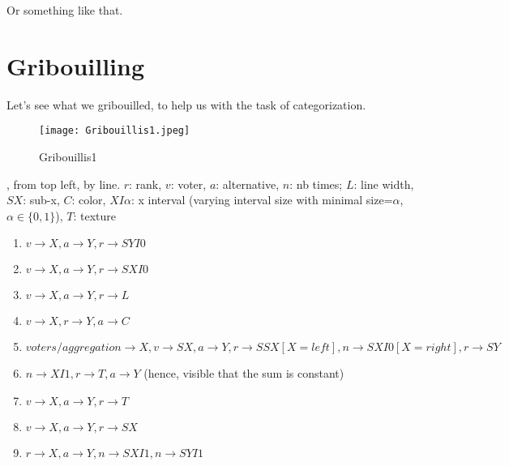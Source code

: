\documentclass[version=last, pagesize, twoside=off, bibliography=totoc, DIV=calc, fontsize=12pt, a4paper, french, english]{scrartcl}
\begin{document}
Or something like that.


\appendix
\section{Gribouilling}
\label{sec:grib}
Let’s see what we gribouilled, to help us with the task of categorization.

\begin{figure}
	\texttt{[image: Gribouillis1.jpeg]}
	\caption{Gribouillis1}
	\label{fig:g1}
\end{figure}

, from top left, by line. $r$: rank, $v$: voter, $a$: alternative, $n$: nb times; $L$: line width, $SX$: sub-x, $C$: color, $XI\alpha$: x interval (varying interval size with minimal size=$\alpha$, $\alpha \in \{0, 1\}$), $T$: texture
\begin{enumerate}
	\item $v→X, a→Y, r→SYI0$
	\item $v→X, a→Y, r→SXI0$
	\item $v→X, a→Y, r→L$
	\item $v→X, r→Y, a→C$
	\item $voters / aggregation→X, v→SX, a→Y, r→SSX[X=left], n→SXI0[X=right], r→SY$
	\item $n→XI1, r→T, a→Y$ (hence, visible that the sum is constant)
	\item $v→X, a→Y, r→T$
	\item $v→X, a→Y, r→SX$
	\item $r→X, a→Y, n→SXI1, n→SYI1$
\end{enumerate}
\end{document}
